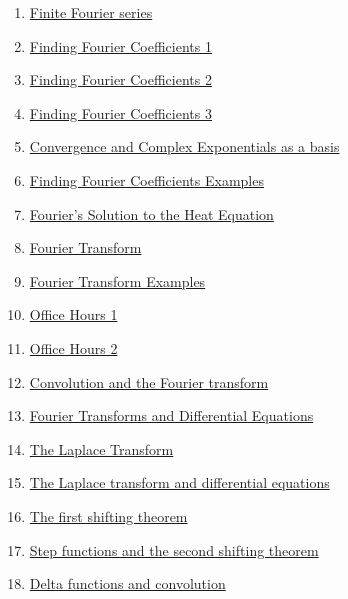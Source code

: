 \documentclass[11pt]{article}
\begin{document}
\begin{multicols}{2}
\begin{enumerate}
		\item \href{https://mp.weixin.qq.com/s/IT-YAv2laZFFqELjLc_mMw}{Finite Fourier series}	%
		\item \href{https://mp.weixin.qq.com/s/jhDl_PgBWr8MY0t3O4Cytg}{Finding Fourier Coefficients 1}	%
		\item \href{https://mp.weixin.qq.com/s/muMlcCCg2QXuc0ekLGYMsA}{Finding Fourier Coefficients 2}	%
		\item \href{https://mp.weixin.qq.com/s/I6sWCBVufnNh3pFrFQ92_Q}{Finding Fourier Coefficients 3}	%
		\item \href{https://mp.weixin.qq.com/s/XKlhkZhxR7Ha7mKxPVGNtw}{\small Convergence and Complex Exponentials as a basis}	%
		\item \href{https://mp.weixin.qq.com/s/PXx3SlR9Ka8E3DeukUY7_A}{Finding Fourier Coefficients Examples}	%
		\item \href{https://mp.weixin.qq.com/s/chM6HkjJe2axUsxUiHsSZw}{Fourier's Solution to the Heat Equation}	%
		\item \href{https://mp.weixin.qq.com/s/EvuiRB9PxD6hmuPNYdhVHA}{Fourier Transform}	%
		\item \href{https://mp.weixin.qq.com/s/gFwPqfxoZx9_ZtVjnm5Y6Q}{Fourier Transform Examples}	%
		\item \href{https://mp.weixin.qq.com/s/S8jPOs36Y_Y10pDdY2lWwQ}{Office Hours 1}	%
		\item \href{https://mp.weixin.qq.com/s/XRqql2vLxs0R_xSNZEWXhA}{Office Hours 2}	%
		\item \href{https://mp.weixin.qq.com/s/K9_j52h07YOPDe45MRkE4Q}{Convolution and the Fourier transform}	%
		\item \href{https://mp.weixin.qq.com/s/dzLLORPQTNBcn5nenIo7hA}{\small Fourier Transforms and Differential Equations}	%
		\item \href{https://mp.weixin.qq.com/s/bw9c_pE9yJ7xOVXzaiA_xg}{The Laplace Transform}	%
		\item \href{https://mp.weixin.qq.com/s/IWYI3NYz3sgdlZ6m3W7dPw}{The Laplace transform and differential equations}	%
		\item \href{https://mp.weixin.qq.com/s/XuEZ43Hx5XlWU5wGGcsRaQ}{The first shifting theorem}	%
		\item \href{https://mp.weixin.qq.com/s/T6HAb4ORMDlE3YISq9KWJg}{\small Step functions and the second shifting theorem}	%
		\item \href{https://mp.weixin.qq.com/s/ZmoRte3319DKf2kCmwa8Vg}{Delta functions and convolution}	%
	\end{enumerate}
	
\end{multicols}
\end{document}
